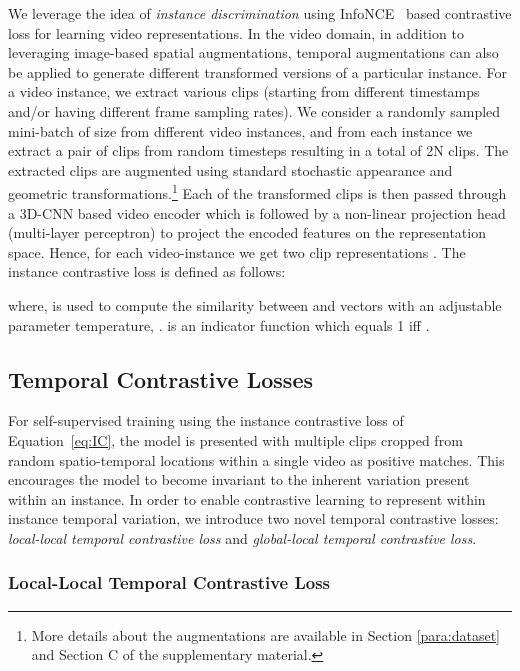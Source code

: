 \documentclass[10pt,twocolumn,letterpaper]{article}
\begin{document}
We leverage the idea of \textit{instance discrimination} using InfoNCE~\cite{nce} based contrastive loss for learning video representations. In the video domain, in addition to leveraging image-based spatial augmentations, temporal augmentations can also be applied to generate different transformed versions of a particular instance. For a video instance, we extract various  clips (starting from different timestamps and/or having different frame sampling rates). We consider a randomly sampled mini-batch of size  from different video instances, and from each instance we extract a pair of clips from random timesteps resulting in a total of 2N clips. The extracted clips are augmented using standard stochastic appearance and geometric transformations.\footnote{More details about the augmentations are available in Section \ref{para:dataset} and Section C of the supplementary material.} Each of the transformed clips is then passed through a 3D-CNN based video encoder which is followed by a non-linear projection head (multi-layer perceptron) to project the encoded features on the representation space. Hence, for each video-instance  we get two clip representations . The instance contrastive loss is defined as follows:




\noindent where,  is used to compute the similarity between  and  vectors with an adjustable parameter temperature, .  is an indicator function which equals 1 iff .
\subsection{Temporal Contrastive Losses}





For self-supervised training using the instance contrastive loss of Equation~\ref{eq:IC}, the model is presented with multiple clips cropped from random spatio-temporal locations within a single video as positive matches. This encourages the model to become invariant to the inherent variation present within an instance. In order to enable contrastive learning to represent within instance temporal variation, we introduce two novel temporal contrastive losses: {\em local-local temporal contrastive loss} and {\em global-local temporal contrastive loss}. 








\subsubsection{Local-Local Temporal Contrastive Loss}
\label{sec:ccl}
\end{document}
